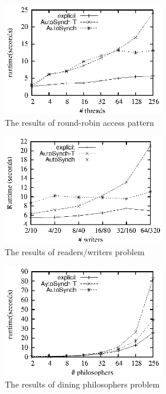 \documentclass{sigplanconf}
\begin{document}
\begin{figure}[ht!]
  \centering
  \includegraphics[width=70mm]{fig/rr.eps}
  \caption{The results of round-robin access pattern}
  \label{fig:rr_eval}
\end{figure}

\begin{figure}[ht!]
  \centering
  \includegraphics[width=70mm]{fig/trw.eps}
  \caption{The results of readers/writers problem}
  \label{fig:rw_eval}
\end{figure}


\begin{figure}[ht!]
  \centering
  \includegraphics[width=70mm]{fig/dp.eps}
  \caption{The results of dining philosophers problem}
  \label{fig:dp_eval}
\end{figure}
\end{document}
